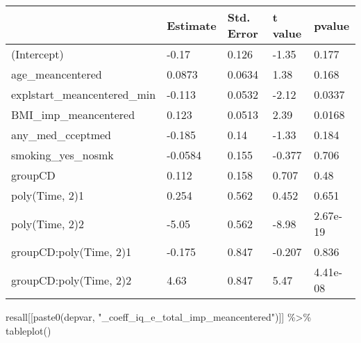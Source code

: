 \documentclass[
]{article}
\newenvironment{Shaded}{\begin{snugshade}}{\end{snugshade}}
\newcommand{\FunctionTok}[1]{\textcolor[rgb]{0.00,0.00,0.00}{#1}}
\newcommand{\NormalTok}[1]{#1}
\newcommand{\SpecialCharTok}[1]{\textcolor[rgb]{0.00,0.00,0.00}{#1}}
\newcommand{\StringTok}[1]{\textcolor[rgb]{0.31,0.60,0.02}{#1}}
\begin{document}
\begin{table}
\centering
\begin{tabular}[t]{l|l|l|l|l}
\hline
  & Estimate & Std. Error & t value & pvalue\\
\hline
(Intercept) & -0.17 & 0.126 & -1.35 & 0.177\\
\hline
age\_meancentered & 0.0873 & 0.0634 & 1.38 & 0.168\\
\hline
explstart\_meancentered\_min & -0.113 & 0.0532 & -2.12 & 0.0337\\
\hline
BMI\_imp\_meancentered & 0.123 & 0.0513 & 2.39 & 0.0168\\
\hline
any\_med\_cceptmed & -0.185 & 0.14 & -1.33 & 0.184\\
\hline
smoking\_yes\_nosmk & -0.0584 & 0.155 & -0.377 & 0.706\\
\hline
groupCD & 0.112 & 0.158 & 0.707 & 0.48\\
\hline
poly(Time, 2)1 & 0.254 & 0.562 & 0.452 & 0.651\\
\hline
poly(Time, 2)2 & -5.05 & 0.562 & -8.98 & 2.67e-19\\
\hline
groupCD:poly(Time, 2)1 & -0.175 & 0.847 & -0.207 & 0.836\\
\hline
groupCD:poly(Time, 2)2 & 4.63 & 0.847 & 5.47 & 4.41e-08\\
\hline
\end{tabular}
\end{table}

\begin{Shaded}
\begin{Highlighting}[]
\NormalTok{resall[[}\FunctionTok{paste0}\NormalTok{(depvar, }\StringTok{"\_coeff\_iq\_e\_total\_imp\_meancentered"}\NormalTok{)]] }\SpecialCharTok{\%\textgreater{}\%} \FunctionTok{tableplot}\NormalTok{()}
\end{Highlighting}
\end{Shaded}
\end{document}
